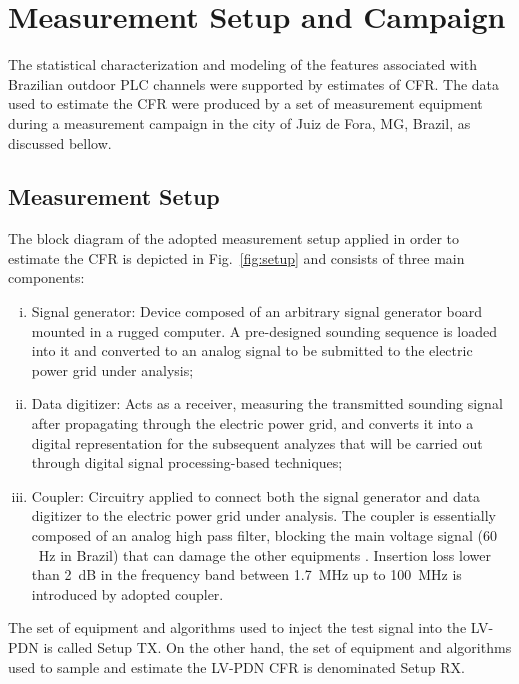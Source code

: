\documentclass[journal]{IEEEtran}
\begin{document}
\section{Measurement Setup and Campaign}
\label{sec:campaign}

The statistical characterization and modeling of the features associated with Brazilian outdoor PLC channels were supported by estimates of \ac{CFR}. The data used to estimate the CFR were produced by a set of measurement equipment during a measurement campaign in the city of Juiz de Fora, MG, Brazil, as discussed bellow.

\subsection{Measurement Setup}

The block diagram of the adopted measurement setup applied in order to estimate the \ac{CFR} is depicted in Fig.~\ref{fig:setup} and consists of three main components:
\begin{enumerate}[(i)]
\item Signal generator: Device composed of an arbitrary signal generator board mounted in a rugged computer.
A pre-designed sounding sequence is loaded into it and converted to an analog signal to be submitted to the electric power grid under analysis;
\item Data digitizer: Acts as a receiver, measuring the transmitted sounding signal after propagating through the electric power grid,
and converts it into a digital representation for the subsequent analyzes that will be carried out through digital signal processing-based techniques;
\item Coupler: Circuitry applied to connect both the signal generator and data digitizer to the electric power grid under analysis.
The coupler is essentially composed of an analog high pass filter, blocking the main voltage signal ($60$~Hz in Brazil) that can damage the other equipments \cite{SilvaCosta2017}. Insertion loss lower than 2~dB in the frequency band between 1.7~MHz up to 100~MHz is introduced by adopted coupler.
\end{enumerate}

The set of equipment and algorithms used to inject the test signal into the \ac{LV-PDN} is called Setup TX. On the other hand, the set of equipment and algorithms used to sample and estimate the \ac{LV-PDN} \ac{CFR} is denominated Setup RX.
\end{document}
